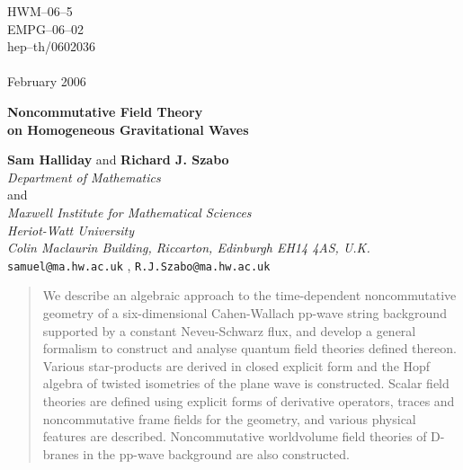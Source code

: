 \documentclass[11pt,a4paper]{article}
\newcommand{\1}{\mathbb{1}}
\begin{document}
\begin{titlepage}
\begin{flushright}

\baselineskip=12pt

HWM--06--5\\
EMPG--06--02\\
hep--th/0602036\\
\hfill{ }\\
February 2006
\end{flushright}

\begin{center}

\vspace{2cm}

\baselineskip=24pt

{\Large\bf Noncommutative Field Theory \\ on Homogeneous Gravitational
  Waves}

\baselineskip=14pt

\vspace{1cm}

{\bf Sam Halliday} and {\bf Richard J. Szabo}
\\[4mm]
{\it Department of Mathematics}\\ and\\ {\it Maxwell Institute for
Mathematical Sciences\\ Heriot-Watt University\\ Colin Maclaurin Building,
  Riccarton, Edinburgh EH14 4AS, U.K.}
\\{\tt samuel@ma.hw.ac.uk} , {\tt R.J.Szabo@ma.hw.ac.uk}
\\[40mm]

\end{center}

\begin{abstract}

\baselineskip=12pt

We describe an algebraic approach to the time-dependent noncommutative
geometry of a six-dimensional Cahen-Wallach pp-wave string background
supported by a constant Neveu-Schwarz flux, and develop a general
formalism to construct and analyse quantum field theories defined
thereon. Various star-products are derived in closed explicit form and
the Hopf algebra of twisted isometries of the plane wave is
constructed. Scalar field theories are defined using explicit forms of
derivative operators, traces and noncommutative frame fields for the
geometry, and various physical features are described. Noncommutative
worldvolume field theories of D-branes in the pp-wave background are
also constructed.

\end{abstract}

\end{titlepage}
\setcounter{page}{2}
\end{document}
